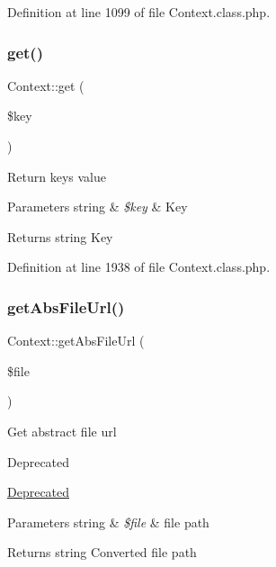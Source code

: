 Definition at line 1099 of file Context.\+class.\+php.

\mbox{\label{classContext_a90ce25d65fe6c9778421cbb36ab3def5}} 
\subsubsection{\texorpdfstring{get()}{get()}}
{\footnotesize\ttfamily Context\+::get (\begin{DoxyParamCaption}\item[{}]{\$key }\end{DoxyParamCaption})}

Return key\textquotesingle{}s value


\begin{DoxyParams}[1]{Parameters}
string & {\em \$key} & Key \\
\hline
\end{DoxyParams}
\begin{DoxyReturn}{Returns}
string Key 
\end{DoxyReturn}


Definition at line 1938 of file Context.\+class.\+php.

\mbox{\label{classContext_a217a7ff0e32178c6a2cc761de9c88998}} 
\subsubsection{\texorpdfstring{get\+Abs\+File\+Url()}{getAbsFileUrl()}}
{\footnotesize\ttfamily Context\+::get\+Abs\+File\+Url (\begin{DoxyParamCaption}\item[{}]{\$file }\end{DoxyParamCaption})}

Get abstract file url

\begin{DoxyRefDesc}{Deprecated}
\item[\hyperlink{deprecated__deprecated000003}{Deprecated}]\end{DoxyRefDesc}

\begin{DoxyParams}[1]{Parameters}
string & {\em \$file} & file path \\
\hline
\end{DoxyParams}
\begin{DoxyReturn}{Returns}
string Converted file path 
\end{DoxyReturn}



